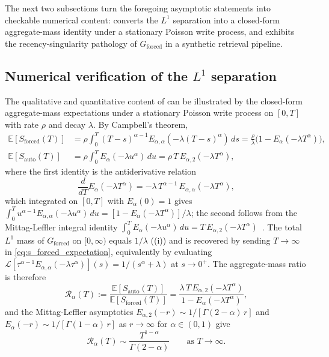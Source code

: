 \documentclass[11pt]{article}
\theoremstyle{definition}
\theoremstyle{remark}
\newcommand{\E}{\mathbb{E}}
\begin{document}
The next two subsections turn the foregoing
asymptotic statements into checkable numerical
content:  converts
the $L^1$ separation into a closed-form
aggregate-mass identity under a stationary Poisson
write process, and 
exhibits the recency-singularity pathology of
$G_{\mathrm{forced}}$ in a synthetic retrieval
pipeline.

\subsection{Numerical verification of the
\texorpdfstring{$L^1$}{L1} separation}
\label{sec:numerical_verification}

The qualitative and quantitative content of
 can be
illustrated by the closed-form aggregate-mass
expectations under a stationary Poisson write process
on $[0, T]$ with rate $\rho$ and decay $\lambda$.
By Campbell's theorem,
\begin{align}
\E[S_{\mathrm{forced}}(T)]
&= \rho \int_0^T (T-s)^{\alpha-1}
   E_{\alpha,\alpha}(-\lambda(T-s)^\alpha)\,ds
 = \frac{\rho}{\lambda}
   \bigl(1 - E_\alpha(-\lambda T^\alpha)\bigr),
\label{eq:s_forced_expectation}\\
\E[S_{\mathrm{auto}}(T)]
&= \rho \int_0^T E_\alpha(-\lambda u^\alpha)\,du
 = \rho\, T\, E_{\alpha,2}(-\lambda T^\alpha),
\label{eq:s_auto_expectation}
\end{align}
where the first identity is the antiderivative
relation
\begin{equation}\label{eq:E_alpha_derivative}
\frac{d}{dT} E_\alpha(-\lambda T^\alpha)
= -\lambda\,T^{\alpha-1}\,
E_{\alpha,\alpha}(-\lambda T^\alpha),
\end{equation}
which integrated on $[0, T]$ with
$E_\alpha(0) = 1$ gives
$\int_0^T u^{\alpha-1}
E_{\alpha,\alpha}(-\lambda u^\alpha)\,du
= [1 - E_\alpha(-\lambda T^\alpha)]/\lambda$;
the second follows from the Mittag-Leffler integral
identity $\int_0^T E_\alpha(-\lambda u^\alpha)\,du
= T\,E_{\alpha,2}(-\lambda T^\alpha)$~\cite[\S 4]{gorenflo2014}.
The total $L^1$ mass of $G_{\mathrm{forced}}$ on
$[0, \infty)$ equals $1/\lambda$
((i)) and is recovered by
sending $T \to \infty$ in
\eqref{eq:s_forced_expectation}, equivalently by
evaluating $\mathcal{L}[\tau^{\alpha-1}
E_{\alpha,\alpha}(-\lambda \tau^\alpha)](s)
= 1/(s^\alpha + \lambda)$ at $s \to 0^+$.
The aggregate-mass ratio is therefore
\begin{equation}\label{eq:l1_ratio}
\mathcal{R}_\alpha(T)
:= \frac{\E[S_{\mathrm{auto}}(T)]}
        {\E[S_{\mathrm{forced}}(T)]}
 = \frac{\lambda\,T\,E_{\alpha,2}(-\lambda T^\alpha)}
        {1 - E_\alpha(-\lambda T^\alpha)},
\end{equation}
and the Mittag-Leffler asymptotics
$E_{\alpha,2}(-r)\sim 1/[\Gamma(2-\alpha)\,r]$ and
$E_\alpha(-r)\sim 1/[\Gamma(1-\alpha)\,r]$ as
$r \to \infty$ for $\alpha \in (0,1)$ give
\begin{equation}\label{eq:l1_ratio_asymptotic}
\mathcal{R}_\alpha(T)
\sim \frac{T^{1-\alpha}}{\Gamma(2-\alpha)}
\qquad \text{as } T \to \infty.
\end{equation}
\end{document}
